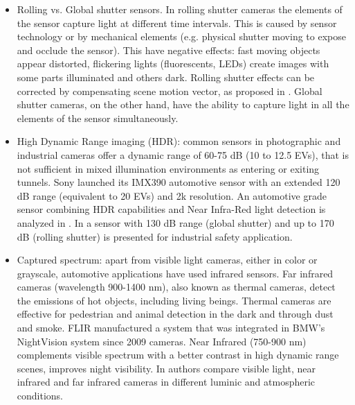 \begin{itemize}
    \item Rolling vs. Global shutter sensors. In rolling
    shutter cameras the elements of the sensor capture light at different time 
    intervals. This is caused by sensor technology or by mechanical elements 
    (e.g. physical shutter moving to expose and occlude the sensor). This have 
    negative effects: fast moving objects appear distorted, flickering lights
    (fluorescents, LEDs) create images with some parts illuminated and others 
    dark. Rolling shutter effects
    can be corrected by compensating scene motion vector, as proposed in 
    \cite{Chia-KaiLiang2008}\cite{Chun2008}.
    Global shutter cameras, on the other hand, have the ability to capture 
    light in all the elements of the sensor simultaneously.
    
    \item High Dynamic Range imaging (HDR): common sensors in photographic and 
    industrial cameras offer a dynamic range of 60-75 dB (10 to 12.5 EVs),
    that is not sufficient in mixed illumination environments as entering or 
    exiting tunnels. Sony launched its IMX390 automotive sensor with an
    extended 120 dB range (equivalent to 20 EVs) and 2k resolution. 
    An automotive grade sensor combining HDR capabilities and 
    Near Infra-Red light detection is analyzed in \cite{Maddalena2005}. 
    In \cite{Strobel2013} a sensor with 130 dB range (global shutter) and up
    to 170 dB (rolling shutter) is presented for industrial safety application. 
        
    \item Captured spectrum: apart from visible light cameras, either in color
    or grayscale, automotive applications have used infrared sensors.
    Far infrared cameras (wavelength 900-1400 nm), 
    also known as thermal cameras, detect the emissions of hot objects, 
    including living beings. Thermal cameras are effective for pedestrian and
    animal detection \cite{OMalley2008}\cite{Besbes2015} in the dark and 
    through dust and smoke. FLIR manufactured a system that was integrated
    in BMW's NightVision system since 2009 cameras. Near Infrared (750-900 nm)
    complements visible spectrum with a better contrast in high dynamic range
    scenes, improves night visibility. In \cite{Pinchon2018} authors compare
    visible light, near infrared and far infrared cameras in different 
    luminic and atmospheric conditions.
    
\end{itemize} 

